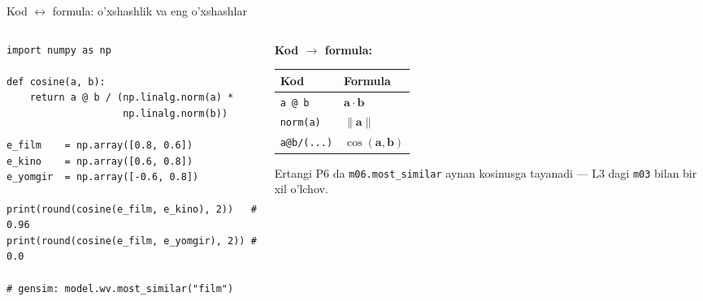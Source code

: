 \documentclass[aspectratio=169,11pt]{beamer}
\begin{document}
\begin{frame}[fragile]{Kod $\leftrightarrow$ formula: o'xshashlik va eng o'xshashlar}
  \begin{columns}[T]
    \begin{column}{0.56\textwidth}
\begin{lstlisting}
import numpy as np

def cosine(a, b):
    return a @ b / (np.linalg.norm(a) *
                    np.linalg.norm(b))

e_film    = np.array([0.8, 0.6])
e_kino    = np.array([0.6, 0.8])
e_yomgir  = np.array([-0.6, 0.8])

print(round(cosine(e_film, e_kino), 2))   # 0.96
print(round(cosine(e_film, e_yomgir), 2)) # 0.0

# gensim: model.wv.most_similar("film")
\end{lstlisting}
    \end{column}
    \begin{column}{0.40\textwidth}
      \textbf{Kod $\to$ formula:}\\[3pt]
      \footnotesize
      \begin{tabular}{p{1.9cm}p{2.1cm}}
        \toprule
        Kod & Formula \\
        \midrule
        \texttt{a @ b} & $\mathbf{a}\cdot\mathbf{b}$ \\
        \texttt{norm(a)} & $\|\mathbf{a}\|$ \\
        \texttt{a@b/(...)} & $\cos(\mathbf{a},\mathbf{b})$ \\
        \bottomrule
      \end{tabular}
      \vspace{4pt}
      \begin{tcolorbox}[okbox,top=2pt,bottom=2pt]
        \footnotesize
        Ertangi P6 da \texttt{m06.most\_similar} aynan kosinusga tayanadi ---
        L3 dagi \texttt{m03} bilan bir xil o'lchov.
      \end{tcolorbox}
    \end{column}
  \end{columns}
\end{frame}
\end{document}
